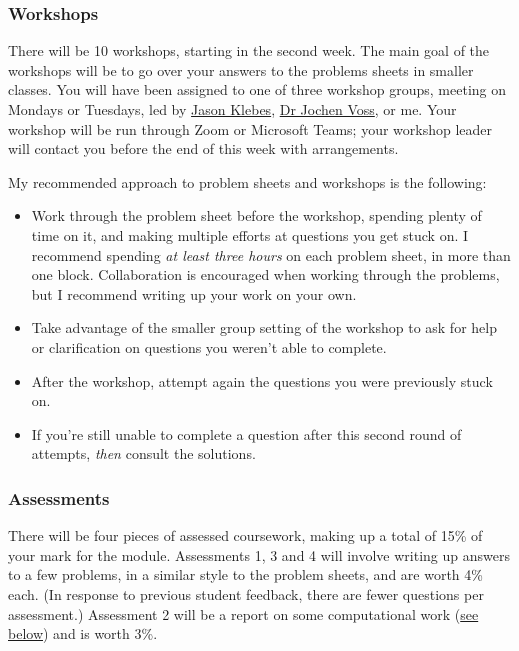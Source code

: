 \documentclass[
  a4paper,
]{article}
\providecommand{\tightlist}{%
  \setlength{\itemsep}{0pt}\setlength{\parskip}{0pt}}
\theoremstyle{definition}
\theoremstyle{definition}
\theoremstyle{definition}
\theoremstyle{remark}
\begin{document}
\hypertarget{workshops}{%
\subsubsection*{Workshops}\label{workshops}}

There will be 10 workshops, starting in the second week. The main goal of the workshops will be to go over your answers to the problems sheets in smaller classes. You will have been assigned to one of three workshop groups, meeting on Mondays or Tuesdays, led by \href{https://eps.leeds.ac.uk/maths/pgr/8790/jason-klebes}{Jason Klebes}, \href{http://www1.maths.leeds.ac.uk/~voss/}{Dr Jochen Voss}, or me. Your workshop will be run through Zoom or Microsoft Teams; your workshop leader will contact you before the end of this week with arrangements.

My recommended approach to problem sheets and workshops is the following:

\begin{itemize}
\tightlist
\item
  Work through the problem sheet before the workshop, spending plenty of time on it, and making multiple efforts at questions you get stuck on. I recommend spending \emph{at least three hours} on each problem sheet, in more than one block. Collaboration is encouraged when working through the problems, but I recommend writing up your work on your own.
\item
  Take advantage of the smaller group setting of the workshop to ask for help or clarification on questions you weren't able to complete.
\item
  After the workshop, attempt again the questions you were previously stuck on.
\item
  If you're still unable to complete a question after this second round of attempts, \emph{then} consult the solutions.
\end{itemize}

\hypertarget{assessments}{%
\subsubsection*{Assessments}\label{assessments}}

There will be four pieces of assessed coursework, making up a total of 15\% of your mark for the module. Assessments 1, 3 and 4 will involve writing up answers to a few problems, in a similar style to the problem sheets, and are worth 4\% each. (In response to previous student feedback, there are fewer questions per assessment.) Assessment 2 will be a report on some computational work (\protect\hyperlink{about--computing}{see below}) and is worth 3\%.
\end{document}
